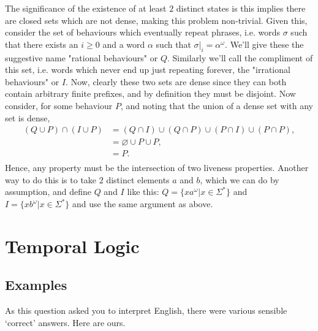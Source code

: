 \documentclass{article}
\begin{document}
The significance of the existence of at least $2$ distinct states is this implies there are closed sets which are not dense, making this problem non-trivial. Given this, consider the set of behaviours which eventually repeat phrases, i.e. words $\sigma$ such that there exists an $i \geq 0$ and a word $\alpha$ such that $\sigma|_i = \alpha^{\omega}$. We'll give these the suggestive name "rational behaviours" or $Q$. Similarly we'll call the compliment of this set, i.e. words which never end up just repeating forever, the "irrational behaviours" or $I$. Now, clearly these two sets are dense since they can both contain arbitrary finite prefixes, and by definition they must be disjoint. Now consider, for some behaviour $P$, and noting that the union of a dense set with any set is dense,
\[
\begin{split}
(Q \cup P) \cap (I \cup P) &= (Q \cap I) \cup (Q \cap P) \cup (P \cap I) \cup (P \cap P),\\
&= \varnothing \cup P \cup P,\\
&= P.\\
\end{split}
\]
Hence, any property must be the intersection of two liveness properties. Another way to do this is to take $2$ distinct elements $a$ and $b$, which we can do by assumption, and define $Q$ and $I$ like this: $Q = \{xa^{\omega} | x \in \Sigma^{\ast}\}$ and $I = \{xb^{\omega} | x \in \Sigma^{\ast}\}$ and use the same argument as above.

\section{Temporal Logic}

\subsection{Examples}

As this question asked you to interpret English, there were various sensible
`correct' answers. Here are ours.
\end{document}
